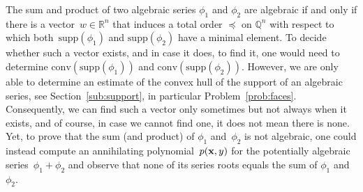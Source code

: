 \documentclass[a4paper,draft]{amsart}
\theoremstyle{definition}
\begin{document}
The sum and product of two algebraic series $\phi_1$ and $\phi_2$ are algebraic if and only if there is a vector~$w\in\mathbb{R}^n$ that induces a total order $\preceq$ on $\mathbb{Q}^n$ with respect to which both~$\mathrm{supp}(\phi_1)$ and $\mathrm{supp}(\phi_2)$ have a minimal element. To decide whether such a vector exists, and in case it does, to find it, one would need to determine $\mathrm{conv}(\mathrm{supp}(\phi_1))$ and $\mathrm{conv}(\mathrm{supp}(\phi_2))$. However, we are only able to determine an estimate of the convex hull of the support of an algebraic series, see Section~\ref{sub:support}, in particular Problem~\ref{prob:faces}. Consequently, we can find such a vector only sometimes but not always when it exists, and of course, in case we cannot find one, it does not mean there is none.
Yet, to prove that the sum (and product) of $\phi_1$ and~$\phi_2$ is not algebraic, one could instead compute an annihilating polynomial~$p(\bold{x},y)$ for the potentially algebraic series~$\phi_1 + \phi_2$ and observe that none of its series roots equals the sum of $\phi_1$ and~$\phi_2$. 
\end{document}
